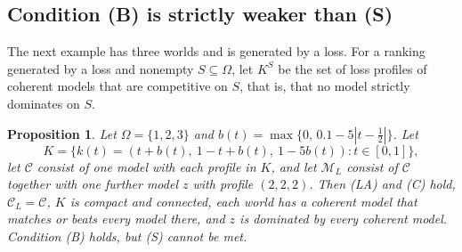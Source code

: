 \documentclass[11pt]{article}
\newtheorem{proposition}[theorem]{Proposition}
\theoremstyle{definition}
\theoremstyle{remark}
\newcommand{\M}{\mathcal M}
\newcommand{\C}{\mathcal C}
\begin{document}
\subsection{Condition (B) is strictly weaker than (S)}\label{sec:strict-weakening}
The next example has three worlds and is generated by a loss. For a ranking generated by a loss and nonempty $S\subseteq\Omega$, let $K^S$ be the set of loss profiles of coherent models that are competitive on $S$, that is, that no model strictly dominates on $S$.

\begin{proposition}\label{prop:threeworld}
Let $\Omega=\{1,2,3\}$ and $b(t)=\max\{0,\,0.1-5|t-\tfrac12|\}$. Let
\[
 K=\{k(t)=(t+b(t),\ 1-t+b(t),\ 1-5b(t)):t\in[0,1]\},
\]
let $\C$ consist of one model with each profile in $K$, and let $\M_L$ consist of $\C$ together with one further model $z$ with profile $(2,2,2)$. Then (LA) and (C) hold, $\C_L=\C$, $K$ is compact and connected, each world has a coherent model that matches or beats every model there, and $z$ is dominated by every coherent model. Condition (B) holds, but (S) cannot be met.
\end{proposition}
\end{document}
